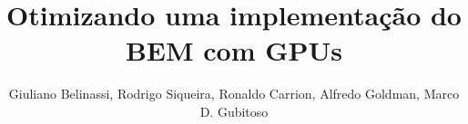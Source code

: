 \documentclass{beamer}
\title[Construção de H \& G]{Otimizando uma implementação do BEM com GPUs} %
\author{Giuliano Belinassi, Rodrigo Siqueira, Ronaldo Carrion, Alfredo Goldman, Marco D. Gubitoso} %
\institute[IME-USP] %
{
Universidade de São Paulo \\ %
\medskip
\textit{ } %
}
\date{\displaydate{date}} %
\begin{document}
\begin{frame}
\titlepage %
\end{frame}



%
%
%
%
\end{document}
